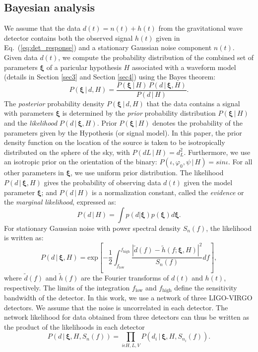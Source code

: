 \documentclass[prd,preprintnumbers,twocolumn,eqsecnum,floatfix,a4paper,nofootinbib,superscriptaddress]{revtex4}
\newcommand{\bxi}{\bm{\xi}}
\begin{document}
\subsection{Bayesian analysis}
We assume that the data $d(t) = n(t) + h(t)$ from the gravitational wave detector contains both the observed signal $h(t)$ given in Eq.~(\ref{eq:det_response}) and a  stationary Gaussian noise component $n(t)$. Given data $d(t)$, we compute the probability distribution of the combined set of parameters ${\bxi}$ of a paricular hypothesis $H$ associated with a waveform model (details in Section \ref{sec3} and Section \ref{sec4}) using the Bayes theorem: 
\begin{equation}
P({\bxi} \, | \, d, H) = \frac{P({\bxi} \, | \, H) \, P (d \, | \, {\bxi}, H)}{P(d \, | \, H)}.
\label{eq:Bayes_theorem}
\end{equation} 
The \emph{posterior} probability density $P({\bxi}\,|\,d,H)$ that the data contains a signal with parameters $\bxi$ is determined by the \emph{prior} probability distribution $P({\bxi} \, | \, H)$ and the \emph{likelihood} $P (d \, | \, {\bxi}, H)$. Prior $P({\bxi} \, | \, H)$ denotes the probability of the parameters given by the Hypothesis (or signal model). In this paper, the prior density function on the location of the source is  taken  to  be  isotropically  distributed  on  the  sphere of  the  sky,  with
$P({dL} \, | \, H)=d_{L}^{2}$. Furthermore, we use an  isotropic  prior  on  the  orientation  of  the  binary: $P({\iota,\varphi_0,\psi} \, | \, H)=sin\iota$. For all other parameters in $\bxi$, we use uniform prior distribution. The likelihood $P (d \, | \, {\bxi}, H)$ gives the probability of observing data $d(t)$ given the model parameter $\bxi$; and $P(d \, | \, H)$ is a normalization constant, called the \emph{evidence} or the \emph{marginal likelihood}, expressed as:
 \begin{equation}
 P(d \, | \, H)=\int p(d|\bxi)p(\bxi)d\bxi.
 \label{eq:evidence}
 \end{equation}
For stationary Gaussian noise with power spectral density $S_n(f)$, the likelihood is written as:
\begin{equation}
P (d \, | \, {\bxi}, H) = \text{exp}\left[ -\frac{1}{2}\int_{f_\mathrm{low}}^{f_\mathrm{high}} \frac{|\tilde{d}(f) - \tilde{h}(f;{\bxi}, H)|^2}{S_n(f)}df\right],
\end{equation}
where $\tilde{d}(f)$ and $\tilde{h}(f)$ are the Fourier transforms of $d(t)$ and $h(t)$, respectively. The limits of the integration $f_\mathrm{low}$ and $f_\mathrm{high}$ define the sensitivity bandwidth of the detector. In this work, we use a network of three LIGO-VIRGO detectors. We assume that the noise is uncorrelated in each detector. The network likelihood for data obtained from three detectors can thus be written as the product of the likelihoods in each detector
\begin{equation}
P (d \, | \, {\bxi}, H, S_n(f)) = \prod_{i \epsilon {H,L,V}} P (d_{i} \, | \, {\bxi}, H, S_{n_{i}}(f)).
\end{equation}
\end{document}
